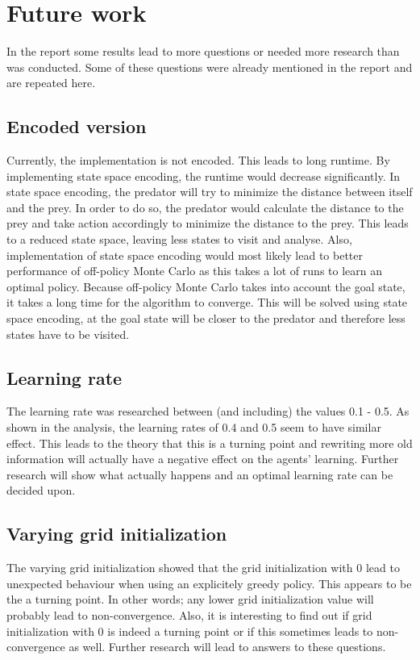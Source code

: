 \documentclass{article}
\begin{document}
\section{Future work}
In the report some results lead to more questions or needed more research than was conducted. Some of these questions were already mentioned in the report and are repeated here. 

\subsection{Encoded version}
Currently, the implementation is not encoded. This leads to long runtime. By implementing state space encoding, the runtime would decrease significantly. In state space encoding, the predator will try to minimize the distance between itself and the prey. In order to do so, the predator would calculate the distance to the prey and take action accordingly to minimize the distance to the prey. This leads to a reduced state space, leaving less states to visit and analyse. Also, implementation of state space encoding would most likely lead to better performance of off-policy Monte Carlo as this takes a lot of runs to learn an optimal policy. Because off-policy Monte Carlo takes into account the goal state, it takes a long time for the algorithm to converge. This will be solved using state space encoding, at the goal state will be closer to the predator and therefore less states have to be visited.

\subsection{Learning rate}
The learning rate was researched between (and including) the values 0.1 - 0.5.  As shown in the analysis, the learning rates of 0.4 and 0.5 seem to have similar effect. This leads to the theory that this is a turning point and rewriting more old information will actually have a negative effect on the agents' learning. Further research will show what actually happens and an optimal learning rate can be decided upon.

\subsection{Varying grid initialization}
The varying grid initialization showed that the grid initialization with 0 lead to unexpected behaviour when using an explicitely greedy policy. This appears to be the a turning point. In other words; any lower grid initialization value will probably lead to non-convergence. Also, it is interesting to find out if grid initialization with 0 is indeed a turning point or if this sometimes leads to non-convergence as well. Further research will lead to answers to these questions. 
\end{document}
